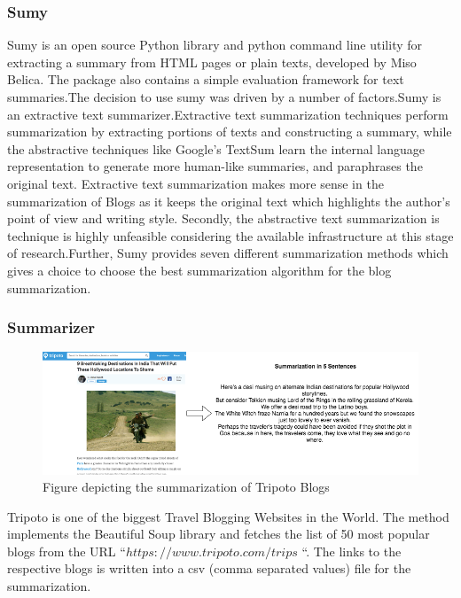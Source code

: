 \subsubsection{Sumy}
Sumy\citep{belica} is an open source Python library and python command line utility for extracting a summary from HTML pages or plain texts, developed by Miso Belica. The package also contains a simple evaluation framework for text summaries.The decision to use sumy was driven by a number of factors.Sumy is an extractive text summarizer.Extractive text summarization techniques perform summarization by extracting portions of texts and constructing a summary, while the abstractive techniques like Google's TextSum learn the internal language representation to generate more human-like summaries,
and paraphrases the original text. Extractive text summarization makes more sense in the summarization of Blogs as it keeps the original text which highlights the author’s point of view and writing style. Secondly, the abstractive text summarization is technique is highly unfeasible considering the available infrastructure at this stage of research.Further, Sumy provides seven different summarization methods which gives a choice to choose the best summarization algorithm for the blog summarization. 

\subsubsection{Summarizer}

\begin{figure}
\includegraphics[width=\textwidth]{figures/textsummary.png}
\caption{Figure depicting the summarization of Tripoto Blogs \footnotemark} \label{fig1}
\end{figure}


Tripoto is one of the biggest Travel Blogging Websites in the World. The method implements the Beautiful Soup library and fetches the list of 50 most popular blogs from the URL “$https://www.tripoto.com/trips$ “. The links to the respective blogs is written into a csv (comma separated values) file for the summarization.

